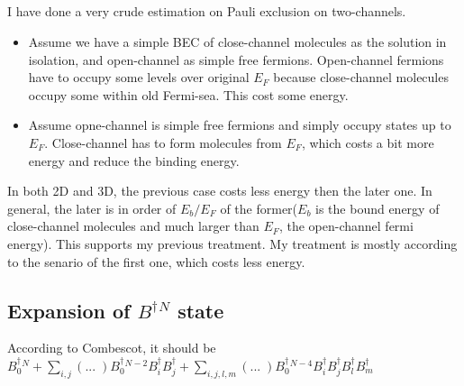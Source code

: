 \subsection{}
I have done a very crude estimation on Pauli exclusion on two-channels.  

\begin{itemize}
	\item Assume we have a simple BEC of close-channel molecules as the solution in isolation, and open-channel as simple free fermions.  Open-channel fermions have to occupy some levels over original $E_F$ because close-channel molecules occupy some within old Fermi-sea. This cost some energy. 
	\item Assume opne-channel is simple free fermions and simply occupy states up to $E_F$. Close-channel has to form molecules from $E_F$, which costs a bit more energy and reduce the binding energy.  
\end{itemize}
In both 2D and 3D, the previous case costs less energy then the later one.  In general, the later is in order of $E_b/E_F$ of the former($E_b$ is the bound energy of close-channel molecules and much larger than $E_F$, the open-channel fermi energy).  This supports my previous treatment.  My treatment is mostly according to the senario of the first one, which costs less energy. 

\subsection{Expansion of $B^\dagger{}^N$ state}
According to Combescot, it should be $B_0^\dagger{}^N+\sum_{i,j}(...\;)B_0^\dagger{}^{N-2}B_i^\dagger{}B_j^\dagger+\sum_{i,j,l,m}(...\;)B_0^\dagger{}^{N-4}B_i^\dagger{}B_j^\dagger{}B_l^\dagger{}B_m^\dagger$